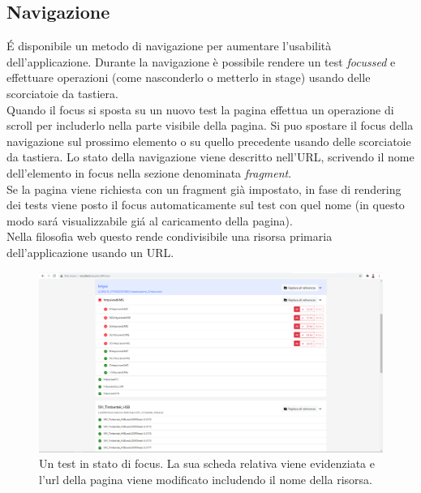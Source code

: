             \subsection{Navigazione}
                \'E  disponibile un metodo di navigazione per aumentare l'usabilità dell'applicazione.
                Durante la navigazione è possibile rendere un test \textit{focussed} e effettuare operazioni (come nasconderlo o metterlo in stage) usando delle scorciatoie da tastiera.\\
                Quando il focus si sposta su un nuovo test la pagina effettua un operazione di scroll per includerlo nella parte visibile della pagina.
                Si puo spostare il focus della navigazione sul prossimo elemento o su quello precedente usando delle scorciatoie da tastiera.
                Lo stato della navigazione viene descritto nell'URL, scrivendo il nome dell'elemento in focus nella sezione denominata \textit{fragment}.\\
                Se la pagina viene richiesta con un fragment già impostato, in fase di rendering dei tests viene posto il focus automaticamente sul test con quel nome (in questo modo sar\'a visualizzabile gi\'a al caricamento della pagina).\\
                Nella filosofia web questo rende condivisibile una risorsa primaria dell'applicazione usando un URL.
            
            \begin{figure}
                \includegraphics[width=\textwidth]{images/active.png}
                \caption{Un test in stato di focus. La sua scheda relativa viene evidenziata e l'url della pagina viene modificato includendo il nome della risorsa.}
            \end{figure}
